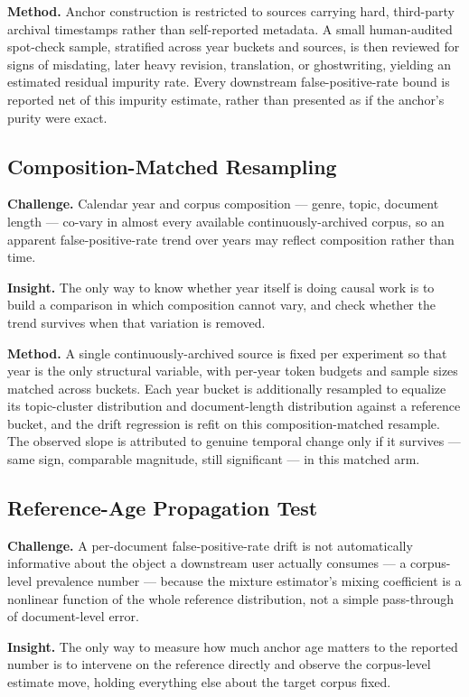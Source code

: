 \documentclass[11pt]{article}
\begin{document}
\textbf{Method.} Anchor construction is restricted to sources carrying hard, third-party archival timestamps rather than self-reported metadata. A small human-audited spot-check sample, stratified across year buckets and sources, is then reviewed for signs of misdating, later heavy revision, translation, or ghostwriting, yielding an estimated residual impurity rate. Every downstream false-positive-rate bound is reported net of this impurity estimate, rather than presented as if the anchor's purity were exact.

\subsection{Composition-Matched Resampling}
\textbf{Challenge.} Calendar year and corpus composition --- genre, topic, document length --- co-vary in almost every available continuously-archived corpus, so an apparent false-positive-rate trend over years may reflect composition rather than time.

\textbf{Insight.} The only way to know whether year itself is doing causal work is to build a comparison in which composition cannot vary, and check whether the trend survives when that variation is removed.

\textbf{Method.} A single continuously-archived source is fixed per experiment so that year is the only structural variable, with per-year token budgets and sample sizes matched across buckets. Each year bucket is additionally resampled to equalize its topic-cluster distribution and document-length distribution against a reference bucket, and the drift regression is refit on this composition-matched resample. The observed slope is attributed to genuine temporal change only if it survives --- same sign, comparable magnitude, still significant --- in this matched arm.

\subsection{Reference-Age Propagation Test}
\textbf{Challenge.} A per-document false-positive-rate drift is not automatically informative about the object a downstream user actually consumes --- a corpus-level prevalence number --- because the mixture estimator's mixing coefficient is a nonlinear function of the whole reference distribution, not a simple pass-through of document-level error.

\textbf{Insight.} The only way to measure how much anchor age matters to the reported number is to intervene on the reference directly and observe the corpus-level estimate move, holding everything else about the target corpus fixed.
\end{document}
